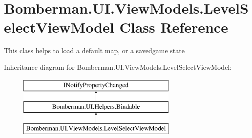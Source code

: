 \hypertarget{class_bomberman_1_1_u_i_1_1_view_models_1_1_level_select_view_model}{}\section{Bomberman.\+U\+I.\+View\+Models.\+Level\+Select\+View\+Model Class Reference}
\label{class_bomberman_1_1_u_i_1_1_view_models_1_1_level_select_view_model}


This class helps to load a default map, or a savedgame state  


Inheritance diagram for Bomberman.\+U\+I.\+View\+Models.\+Level\+Select\+View\+Model\+:\begin{figure}[H]
\begin{center}
\leavevmode
\includegraphics[height=3.000000cm]{class_bomberman_1_1_u_i_1_1_view_models_1_1_level_select_view_model}
\end{center}
\end{figure}
